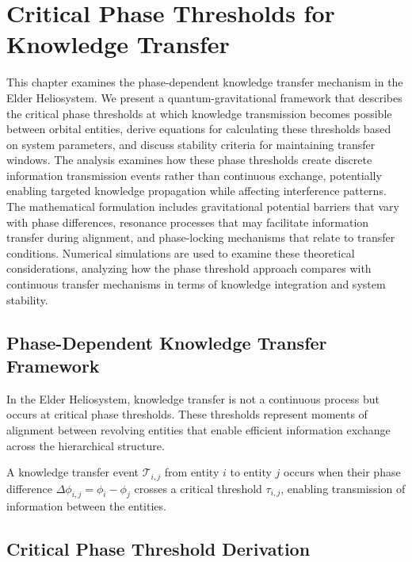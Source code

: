 \chapter{Critical Phase Thresholds for Knowledge Transfer}

\begin{tcolorbox}[colback=blue!5!white,colframe=blue!75!black,title=Chapter Summary]
This chapter examines the phase-dependent knowledge transfer mechanism in the Elder Heliosystem. We present a quantum-gravitational framework that describes the critical phase thresholds at which knowledge transmission becomes possible between orbital entities, derive equations for calculating these thresholds based on system parameters, and discuss stability criteria for maintaining transfer windows. The analysis examines how these phase thresholds create discrete information transmission events rather than continuous exchange, potentially enabling targeted knowledge propagation while affecting interference patterns. The mathematical formulation includes gravitational potential barriers that vary with phase differences, resonance processes that may facilitate information transfer during alignment, and phase-locking mechanisms that relate to transfer conditions. Numerical simulations are used to examine these theoretical considerations, analyzing how the phase threshold approach compares with continuous transfer mechanisms in terms of knowledge integration and system stability.
\end{tcolorbox}

\section{Phase-Dependent Knowledge Transfer Framework}

In the Elder Heliosystem, knowledge transfer is not a continuous process but occurs at critical phase thresholds. These thresholds represent moments of alignment between revolving entities that enable efficient information exchange across the hierarchical structure.

\begin{definition}
A knowledge transfer event $\mathcal{T}_{i,j}$ from entity $i$ to entity $j$ occurs when their phase difference $\Delta\phi_{i,j} = \phi_i - \phi_j$ crosses a critical threshold $\tau_{i,j}$, enabling transmission of information between the entities.
\end{definition}

\section{Critical Phase Threshold Derivation}

